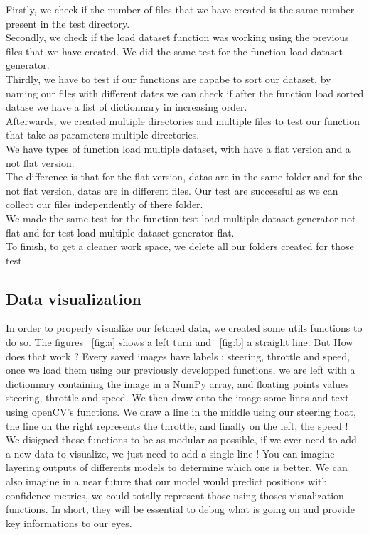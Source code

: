 \documentclass[12pt]{article}
\begin{document}
Firstly, we check if the number of files that we have created  is the same number present in the test directory. \\

Secondly, we check if the load dataset function was working using the previous files that we have created. We did the same test for the function load dataset generator. \\

Thirdly, we have to test if our functions are capabe to sort our dataset, by naming our files with different dates we can check if after the function load sorted datase we have a list of dictionnary in increasing order. \\

Afterwards, we created multiple directories and multiple files to test our function that take as parameters multiple directories. \\

We have types of function load multiple dataset, with have a flat version and a not flat version. \\
The difference is that for the flat version, datas are in the same folder and for the not flat version, datas are in different files. Our test are successful as we can collect our files independently of there folder. \\

We made the same test for the function test load multiple dataset generator not flat and for test load multiple dataset generator flat. \\

To finish, to get a cleaner work space, we delete all our folders created for those test. \\

\subsection{Data visualization}
In order to properly visualize our fetched data, we created some utils functions to do so.
The figures ~\ref{fig:a} shows a left turn and ~\ref{fig:b} a straight line. But How does that work ? Every saved images have labels : steering, throttle and speed, once we load them using our previously developped functions, we are left with a dictionnary containing the image in a NumPy array, and floating points values steering, throttle and speed. We then draw onto the image some lines and text using openCV's functions. We draw a line in the middle using our steering float, the line on the right represents the throttle, and finally on the left, the speed ! We disigned those functions to be as modular as possible, if we ever need to add a new data to visualize, we just need to add a single line ! You can imagine layering outputs of differents models to determine which one is better. We can also imagine in a near future that our model would predict positions with confidence metrics, we could totally represent those using thoses visualization functions. In short, they will be essential to debug what is going on and provide key informations to our eyes.
\end{document}
